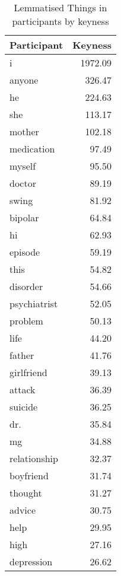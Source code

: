         \begin{table}[h!] \singlespacing \small \centering
        \begin{tabular}{lr}
                \toprule
                Participant &  Keyness \\
                \midrule
                i            &  1972.09 \\
                anyone       &   326.47 \\
                he           &   224.63 \\
                she          &   113.17 \\
                mother       &   102.18 \\
                medication   &    97.49 \\
                myself       &    95.50 \\
                doctor       &    89.19 \\
                swing        &    81.92 \\
                bipolar      &    64.84 \\
                hi           &    62.93 \\ %
                episode      &    59.19 \\
                this         &    54.82 \\
                disorder     &    54.66 \\
                psychiatrist &    52.05 \\
                problem      &    50.13 \\
                life         &    44.20 \\
                father       &    41.76 \\
                girlfriend   &    39.13 \\
                attack       &    36.39 \\
                suicide      &    36.25 \\
                dr.          &    35.84 \\
                mg           &    34.88 \\
                relationship &    32.37 \\
                boyfriend    &    31.74 \\
                thought      &    31.27 \\
                advice       &    30.75 \\
                help         &    29.95 \\
                high         &    27.16 \\
                depression   &    26.62 \\
                \bottomrule
                \end{tabular}
                \caption{Lemmatised Things in participants by keyness} 
        \end{table}

